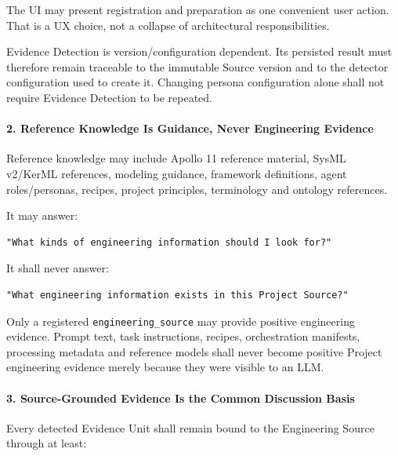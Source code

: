 The UI may present registration and preparation as one convenient user action. That is a UX choice, not a collapse of architectural responsibilities.

Evidence Detection is version/configuration dependent. Its persisted result must therefore remain traceable to the immutable Source version and to the detector configuration used to create it. Changing persona configuration alone shall not require Evidence Detection to be repeated.

\hypertarget{2-reference-knowledge-is-guidance-never-engineering-evidence}{%
\paragraph{2. Reference Knowledge Is Guidance, Never Engineering Evidence}\label{2-reference-knowledge-is-guidance-never-engineering-evidence}}

Reference knowledge may include Apollo 11 reference material, SysML v2/KerML references, modeling guidance, framework definitions, agent roles/personas, recipes, project principles, terminology and ontology references.

It may answer:

\begin{verbatim}
"What kinds of engineering information should I look for?"
\end{verbatim}

It shall never answer:

\begin{verbatim}
"What engineering information exists in this Project Source?"
\end{verbatim}

Only a registered \texttt{engineering\_source} may provide positive engineering evidence. Prompt text, task instructions, recipes, orchestration manifests, processing metadata and reference models shall never become positive Project engineering evidence merely because they were visible to an LLM.

\hypertarget{3-source-grounded-evidence-is-the-common-discussion-basis}{%
\paragraph{3. Source-Grounded Evidence Is the Common Discussion Basis}\label{3-source-grounded-evidence-is-the-common-discussion-basis}}

Every detected Evidence Unit shall remain bound to the Engineering Source through at least:

